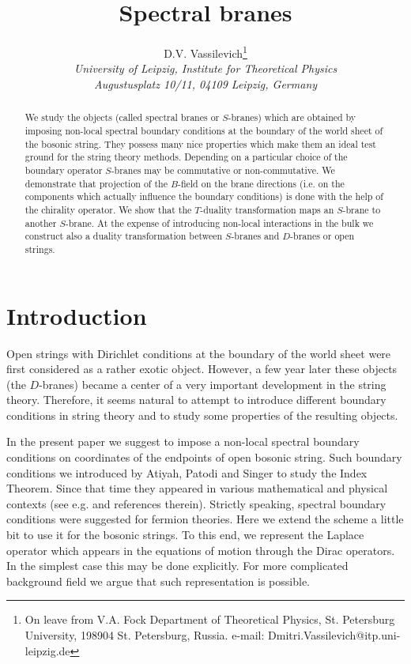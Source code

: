 \documentclass[a4paper,12pt,twoside]{article}
\begin{document}
\title{Spectral branes}
\author{D.V. Vassilevich\thanks{On leave from V.A. Fock
Department of Theoretical Physics,
     St. Petersburg University,
     198904 St. Petersburg, Russia.
     e-mail: Dmitri.Vassilevich@itp.uni-leipzig.de} \\
{\it University of Leipzig, Institute for Theoretical Physics}\\
{\it  Augustusplatz 10/11, 04109 Leipzig, Germany}}

\maketitle

\begin{abstract}
We study the objects (called spectral branes or $S$-branes)
which are obtained by imposing non-local spectral boundary
conditions at the boundary of the world sheet of the bosonic
string. They possess many nice properties
which make them an ideal test ground for the string theory methods.
Depending on a particular choice of the boundary
operator $S$-branes may be commutative or non-commutative.
We demonstrate that projection of the $B$-field 
on the brane directions (i.e. on the components
which actually influence the boundary conditions) is done with the help of the
chirality operator.
We show that the $T$-duality transformation maps an
$S$-brane to another $S$-brane. At the expense of introducing
non-local interactions in the bulk we construct also
a duality transformation between $S$-branes and $D$-branes
or open strings.
\end{abstract}

\section{Introduction}
Open strings with Dirichlet conditions at the boundary
of the world sheet \cite{Dai:1989ua,Leigh:1989jq} were
first considered as a rather exotic object. However,
a few year later \cite{Polchinski:1995mt} these objects
(the $D$-branes) became a center of a very important
development in the string theory. Therefore, it seems
natural to attempt to introduce different boundary
conditions in string theory and to study some properties
of the resulting objects.

In the present paper we suggest to impose a non-local
 spectral boundary conditions on coordinates of the endpoints
of open bosonic string. Such boundary conditions we introduced
by Atiyah, Patodi and Singer \cite{Atiyah:1980jh} to study
the Index Theorem. Since that time they appeared in
various mathematical and physical contexts (see e.g.
\cite{Grubb95,Dowker:2000sy,Mishchenko:1992vm,Falomir:1998as,Esposito:1997mw}
and references therein). Strictly speaking, spectral boundary
conditions were suggested for fermion theories. Here
we extend the scheme a little bit to use it for the bosonic
strings. To this end, we represent the Laplace operator
which appears in the equations of motion through the Dirac
operators. In the simplest case this may be done explicitly.
For more complicated background field we argue that such
representation is possible.
\end{document}
